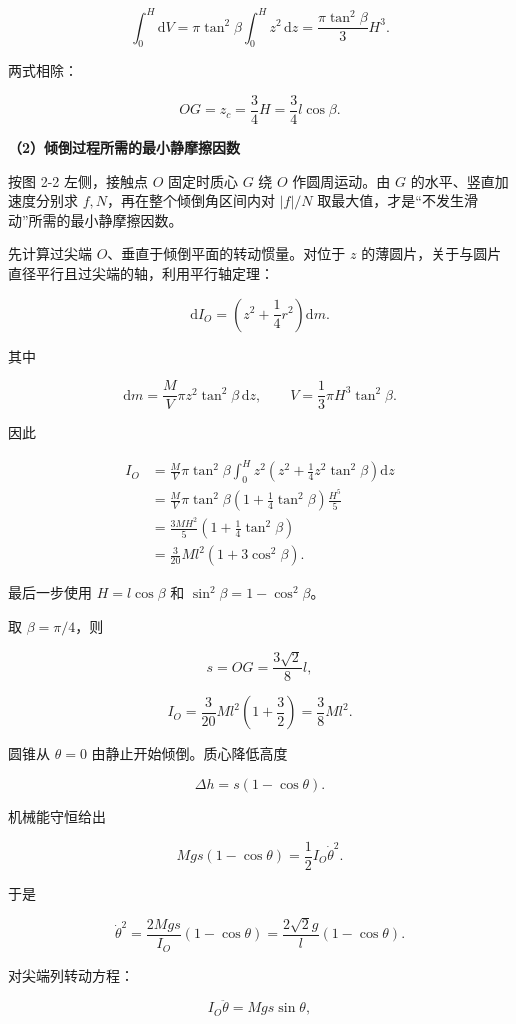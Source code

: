\documentclass[12pt,a4paper,UTF8]{ctexart}
\begin{document}
\[\int_0^H\mathrm dV
=\pi\tan^2\beta\int_0^H z^2\,\mathrm dz
=\frac{\pi\tan^2\beta}{3}H^3.\]

两式相除：

\[\boxed{OG=z_c=\frac34H=\frac34l\cos\beta}. \tag{13}\]

\textbf{（2）倾倒过程所需的最小静摩擦因数}

按图 2-2 左侧，接触点 \(O\) 固定时质心 \(G\) 绕 \(O\) 作圆周运动。由
\(G\) 的水平、竖直加速度分别求 \(f,N\)，再在整个倾倒角区间内对 \(|f|/N\)
取最大值，才是``不发生滑动''所需的最小静摩擦因数。

先计算过尖端 \(O\)、垂直于倾倒平面的转动惯量。对位于 \(z\)
的薄圆片，关于与圆片直径平行且过尖端的轴，利用平行轴定理：

\[\mathrm dI_O=\left(z^2+\frac14r^2\right)\mathrm dm.\]

其中

\[\mathrm dm=\frac{M}{V}\pi z^2\tan^2\beta\,\mathrm dz,
\qquad V=\frac13\pi H^3\tan^2\beta.\]

因此

\[\begin{aligned}
I_O
&=\frac{M}{V}\pi\tan^2\beta
\int_0^H z^2\left(z^2+\frac14z^2\tan^2\beta\right)\mathrm dz\\
&=\frac{M}{V}\pi\tan^2\beta
\left(1+\frac14\tan^2\beta\right)\frac{H^5}{5}\\
&=\frac{3MH^2}{5}\left(1+\frac14\tan^2\beta\right)\\
&=\frac{3}{20}Ml^2\left(1+3\cos^2\beta\right).
\end{aligned} \tag{14}\]

最后一步使用 \(H=l\cos\beta\) 和 \(\sin^2\beta=1-\cos^2\beta\)。

取 \(\beta=\pi/4\)，则

\[s=OG=\frac{3\sqrt2}{8}l,\]

\[I_O=\frac{3}{20}Ml^2\left(1+\frac32\right)
=\frac38Ml^2. \tag{15}\]

圆锥从 \(\theta=0\) 由静止开始倾倒。质心降低高度

\[\Delta h=s(1-\cos\theta).\]

机械能守恒给出

\[Mgs(1-\cos\theta)=\frac12I_O\dot\theta^2.\]

于是

\[\dot\theta^2
=\frac{2Mgs}{I_O}(1-\cos\theta)
=\frac{2\sqrt2g}{l}(1-\cos\theta). \tag{16}\]

对尖端列转动方程：

\[I_O\ddot\theta=Mgs\sin\theta,\]
\end{document}
